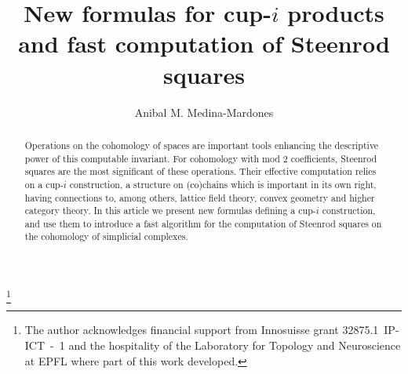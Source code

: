 \documentclass{amsart}
\theoremstyle{definition}
\begin{document}
	
	\title{New formulas for cup-$i$ products and fast computation of Steenrod squares}
	\author{Anibal M. Medina-Mardones}
	\address{Max Planck Institute for Mathematics, Bonn, Germany}
	\address{Department of Mathematics, University of Notre, Notre Dame, IN, USA}
	\thanks{The author acknowledges financial support from Innosuisse grant \mbox{32875.1 IP-ICT - 1} and the hospitality of the Laboratory for Topology and Neuroscience at EPFL where part of this work developed.}
	
	\begin{abstract}
		Operations on the cohomology of spaces are important tools enhancing the descriptive power of this computable invariant.
		For cohomology with mod 2 coefficients, Steenrod squares are the most significant of these operations.
		Their effective computation relies on a cup-$i$ construction, a structure on (co)chains which is important in its own right, having connections to, among others, lattice field theory, convex geometry and higher category theory.
		In this article we present new formulas defining a cup-$i$ construction, and use them to introduce a fast algorithm for the computation of Steenrod squares on the cohomology of simplicial complexes.
	\end{abstract}
	
	\maketitle
	\tableofcontents	
	
	
	
	
	
	
	
	
	
	
	
\end{document}
